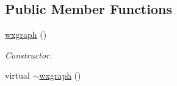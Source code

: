 \subsection*{Public Member Functions}
\begin{DoxyCompactItemize}
\item 
\hyperlink{classlgraph_1_1utils_1_1wxgraph_aaf4bc23e2bc74fd2a28aff2f56c6dbb2}{wxgraph} ()\hypertarget{classlgraph_1_1utils_1_1wxgraph_aaf4bc23e2bc74fd2a28aff2f56c6dbb2}{}\label{classlgraph_1_1utils_1_1wxgraph_aaf4bc23e2bc74fd2a28aff2f56c6dbb2}

\begin{DoxyCompactList}\small\item\em Constructor. \end{DoxyCompactList}\item 
virtual \hyperlink{classlgraph_1_1utils_1_1wxgraph_a970197826a0b64152fd812929b9038f1}{$\sim$wxgraph} ()\hypertarget{classlgraph_1_1utils_1_1wxgraph_a970197826a0b64152fd812929b9038f1}{}\label{classlgraph_1_1utils_1_1wxgraph_a970197826a0b64152fd812929b9038f1}


\end{DoxyCompactItemize}
